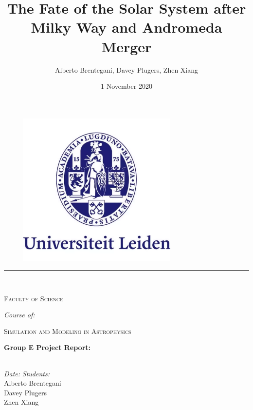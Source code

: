 \documentclass[a4paper,12pt, english]{article}
\title{The Fate of the Solar System after Milky Way and Andromeda Merger}
\author{Alberto Brentegani, Davey Plugers, Zhen Xiang}
\date{1 November 2020}
\begin{document}

\begin{titlepage}
\makeatletter
\begin{center}

\vspace*{-1in}
\begin{figure}[htb]
    \centering
    \includegraphics[width=8cm]{lu_logo.png}
\end{figure}

\vspace{-25pt}
\rule{125mm}{0.1mm} \\
\vspace{5pt}
\begin{Large}
    \textsc{Faculty of Science}\\
\end{Large}
\vspace{5pt}
\textit{Course of:}\\

\begin{Large}
    \textsc{Simulation and Modeling in Astrophysics}\\
\end{Large}
\vspace{30pt}

\begin{LARGE}
    \textbf{Group E Project Report:} \\
    \textbf{\@title} \\
\end{LARGE}
\vfill

\begin{normalsize}
	\begin{flushleft}
	  \textit{Date:} \hfill \textit{Students:}\\
	  \vspace{1pt}
	  \@date \hfill Alberto Brentegani\\
	  \hfill Davey Plugers\\
	  \hfill Zhen Xiang\\
	  \vspace{10pt}
	\end{flushleft}
\end{normalsize}
\vspace{20pt}


\end{center}
\end{titlepage}
\end{document}
